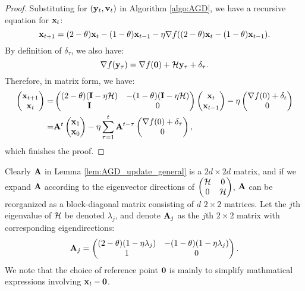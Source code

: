\begin{proof}
Substituting for $(\mathbf{y}_t, \mathbf{v}_t)$ in Algorithm \ref{algo:AGD}, we have a recursive equation for $\mathbf{x}_t$:
\begin{equation} \label{eq:update_AGD}
\mathbf{x}_{t+1}  = (2-\theta) \mathbf{x}_{t}
- (1-\theta)  \mathbf{x}_{t-1}
 -\eta \nabla f((2-\theta) \mathbf{x}_{t}
- (1-\theta)  \mathbf{x}_{t-1}).
\end{equation}
By definition of $\delta_\tau$, we also have:
\begin{equation*}
\nabla f(\mathbf{y}_\tau) = \nabla f(\mathbf{0}) + \mathcal{H} \mathbf{y}_\tau + \delta_\tau.
\end{equation*}
Therefore, in matrix form, we have:
\begin{align*}
\begin{pmatrix}
\mathbf{x}_{t+1} \\ \mathbf{x}_t
\end{pmatrix}
=& 
\begin{pmatrix}
(2-\theta) (\mathbf{I} - \eta \mathcal{H})&  -(1-\theta) (\mathbf{I} - \eta \mathcal{H}) \\
\mathbf{I}& 0
\end{pmatrix}
\begin{pmatrix}
\mathbf{x}_{t} \\ \mathbf{x}_{t-1}
\end{pmatrix}  - \eta
\begin{pmatrix}
\nabla f(0) + \delta_t \\ 0
\end{pmatrix} \\
=& \mathbf{A}^{t}\begin{pmatrix}
\mathbf{x}_1 \\ \mathbf{x}_0
\end{pmatrix} 
-\eta\sum_{\tau = 1}^t \mathbf{A}^{t-\tau}
\begin{pmatrix}
\nabla f(0) + \delta_\tau \\ 0
\end{pmatrix},
\end{align*}
which finishes the proof.
\end{proof}
Clearly $\mathbf{A}$ in Lemma \ref{lem:AGD_update_general} is a $2d \times 2d$ matrix, and if we expand $\mathbf{A}$ according to the eigenvector directions of $\begin{pmatrix}
\mathcal{H}& 0 \\
0 & \mathcal{H}
\end{pmatrix}$, $\mathbf{A}$ can be reorganized as a block-diagonal matrix consisting of $d$ $2\times 2$ matrices. Let the $j$th eigenvalue of $\mathcal{H}$ be denoted $\lambda_j$, and denote $\mathbf{A}_j$ as the $j$th $2\times 2$ matrix with corresponding eigendirections:
\begin{equation}\label{eq:definition_Aj}
\mathbf{A}_j = \begin{pmatrix}
(2-\theta) (1 - \eta \lambda_j)&  -(1-\theta) (1 - \eta \lambda_j) \\
1 & 0\end{pmatrix}.
\end{equation}
We note that the choice of reference point $\mathbf{0}$ is mainly to simplify
mathmatical expressions involving $\mathbf{x}_t - \mathbf{0}$. 

